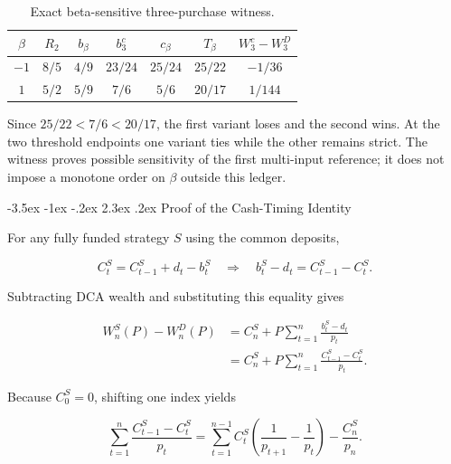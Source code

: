 \documentclass[12pt,a4paper,oneside]{report}
\makeatletter
\renewcommand\section{\@startsection{section}{1}{\z@}%
  {-3.5ex \@plus -1ex \@minus -.2ex}%
  {2.3ex \@plus .2ex}%
  {\normalfont\fontsize{14}{17}\selectfont\bfseries}}
\makeatother
\begin{document}
\begin{table}[htbp]
  \centering
  \singlespacing\fontsize{9}{11}\selectfont
  \renewcommand{\arraystretch}{1.15}
  \begin{tabular}{c c c c c c c}
    \toprule
    \textbf{$\beta$} & \textbf{$R_2$} & \textbf{$b_\beta$} & \textbf{$b_3^c$} & \textbf{$c_\beta$} & \textbf{$T_\beta$} & \textbf{$W_3^c-W_3^D$} \\
    \midrule
    $-1$ & $8/5$ & $4/9$ & $23/24$ & $25/24$ & $25/22$ & $-1/36$ \\
    $1$ & $5/2$ & $5/9$ & $7/6$ & $5/6$ & $20/17$ & $1/144$ \\
    \bottomrule
  \end{tabular}
  \caption{Exact beta-sensitive three-purchase witness.}
  \label{tab:appendix-three-beta-witness}
\end{table}

Since $25/22<7/6<20/17$, the first variant loses and the second wins.
At the two threshold endpoints one variant ties while the other remains strict.
The witness proves possible sensitivity of the first multi-input reference; it
does not impose a monotone order on $\beta$ outside this ledger.

\section{Proof of the Cash-Timing Identity}
\label{sec:appendix-cash-timing}

For any fully funded strategy $S$ using the common deposits,

\begin{equation}
  C_t^S=C_{t-1}^S+d_t-b_t^S
  \quad\Longrightarrow\quad
  b_t^S-d_t=C_{t-1}^S-C_t^S.
  \label{eq:appendix-cash-recursion}
\end{equation}

Subtracting DCA wealth and substituting this equality gives

\begin{align}
  W_n^S(P)-W_n^D(P)
  &=C_n^S+P\sum_{t=1}^{n}\frac{b_t^S-d_t}{p_t}\\
  &=C_n^S+P\sum_{t=1}^{n}\frac{C_{t-1}^S-C_t^S}{p_t}.
  \label{eq:appendix-cash-substitution}
\end{align}

Because $C_0^S=0$, shifting one index yields

\begin{equation}
  \sum_{t=1}^{n}\frac{C_{t-1}^S-C_t^S}{p_t}
  =\sum_{t=1}^{n-1}C_t^S
       \left(\frac1{p_{t+1}}-\frac1{p_t}\right)
   -\frac{C_n^S}{p_n}.
  \label{eq:appendix-cash-telescope}
\end{equation}
\end{document}
